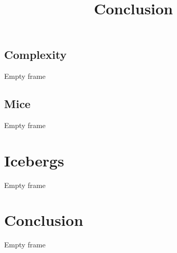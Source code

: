 \documentclass{beamer}
\begin{document}
\subsection{Complexity}
\begin{frame}
Empty frame
\end{frame}

\subsection{Mice}
\begin{frame}
Empty frame
\end{frame}


\section{Icebergs}

\begin{frame}
Empty frame
\end{frame}



\section*{Conclusion}

\begin{frame}
\title{Conclusion}
Empty frame

\end{frame}

 
\end{document}

